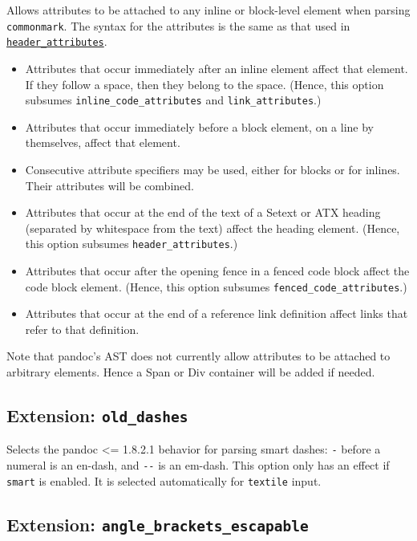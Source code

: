 \documentclass[
  b5paper
]{book}
\providecommand{\tightlist}{%
  \setlength{\itemsep}{0pt}\setlength{\parskip}{0pt}}
\begin{document}
Allows attributes to be attached to any inline or block-level element
when parsing \texttt{commonmark}. The syntax for the attributes is the
same as that used in
\hyperref[extension-header_attributes]{\texttt{header\_attributes}}.

\begin{itemize}
\tightlist
\item
  Attributes that occur immediately after an inline element affect that
  element. If they follow a space, then they belong to the space.
  (Hence, this option subsumes \texttt{inline\_code\_attributes} and
  \texttt{link\_attributes}.)
\item
  Attributes that occur immediately before a block element, on a line by
  themselves, affect that element.
\item
  Consecutive attribute specifiers may be used, either for blocks or for
  inlines. Their attributes will be combined.
\item
  Attributes that occur at the end of the text of a Setext or ATX
  heading (separated by whitespace from the text) affect the heading
  element. (Hence, this option subsumes \texttt{header\_attributes}.)
\item
  Attributes that occur after the opening fence in a fenced code block
  affect the code block element. (Hence, this option subsumes
  \texttt{fenced\_code\_attributes}.)
\item
  Attributes that occur at the end of a reference link definition affect
  links that refer to that definition.
\end{itemize}

Note that pandoc's AST does not currently allow attributes to be
attached to arbitrary elements. Hence a Span or Div container will be
added if needed.

\subsection{\texorpdfstring{Extension:
\texttt{old\_dashes}}{Extension: old\_dashes}}\label{extension-old_dashes}

Selects the pandoc \textless= 1.8.2.1 behavior for parsing smart dashes:
\texttt{-} before a numeral is an en-dash, and \texttt{-\/-} is an
em-dash. This option only has an effect if \texttt{smart} is enabled. It
is selected automatically for \texttt{textile} input.

\subsection{\texorpdfstring{Extension:
\texttt{angle\_brackets\_escapable}}{Extension: angle\_brackets\_escapable}}\label{extension-angle_brackets_escapable}
\end{document}
